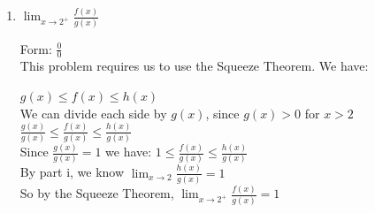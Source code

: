 \documentclass[nooutcomes,handout]{ximera}
\begin{document}
\begin{problem}
\begin{enumerate}
\begin{enumerate}
		\item $\lim_{x \to 2^+}\frac{f(x)}{g(x)}$

		\begin{freeResponse}
		Form: $\frac{{0}}{0}$ \\
		This problem requires us to use the Squeeze Theorem.  We have: \\ 
		\begin{center}
		$g(x) \le f(x) \le h(x)$ \\

		We can divide each side by $g(x)$, since  $g(x)>0$ for $x>2$ \\
		 $\frac{g(x)}{g(x)} \le \frac{f(x)}{g(x)} \le \frac{h(x)}{g(x)}$\\
		Since $\frac{g(x)}{g(x)}=1$ we have: $1 \le \frac{f(x)}{g(x)} \le \frac{h(x)}{g(x)}$\\
		By part i, we know $\lim_{x \to 2}\frac{h(x)}{g(x)}=1$\\
		So by the Squeeze Theorem, $\lim_{x \to 2^+}\frac{f(x)}{g(x)}=1$
			\end{center}
		\end{freeResponse}	

		\end{enumerate}
	
	\end{enumerate}

	
\end{problem}



								
				
				
	
\end{document}
